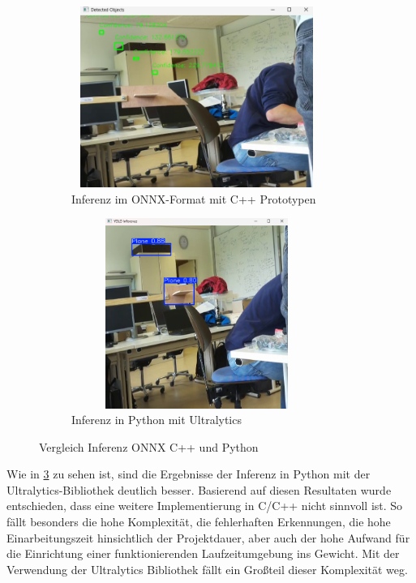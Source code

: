\begin{figure}[h]
\centering
\begin{subfigure}[b]{0.48\textwidth}
  \centering
  \includegraphics[width=0.9\textwidth,height=5.9cm,keepaspectratio]{images/ONNX_Inferenz.png}
  \caption{Inferenz im ONNX-Format mit C++ Prototypen}
  \label{fig:Screenshot: Inferenz im ONNX-Format mit C++ Prototypen}
\end{subfigure}
\hfill
\begin{subfigure}[b]{0.48\textwidth}
  \centering
  \includegraphics[width=0.9\textwidth,height=6.2cm,keepaspectratio]{images/Python_Inferenz.png}
  \caption{Inferenz in Python mit Ultralytics}
  \label{fig:Screenshot: Inferenz Python mit Ultralytics}
\end{subfigure}
\caption{Vergleich Inferenz ONNX C++ und Python}
\label{tab:Vergleich Inferenz ONNX C++ und Python}
\end{figure}

Wie in \ref{tab:Vergleich Inferenz ONNX C++ und Python} zu sehen ist, sind die Ergebnisse der Inferenz in Python mit der Ultralytics-Bibliothek deutlich besser.
Basierend auf diesen Resultaten wurde entschieden, dass eine weitere Implementierung in C/C++ nicht sinnvoll ist. So fällt besonders die hohe Komplexität, die fehlerhaften Erkennungen, die hohe Einarbeitungszeit hinsichtlich der Projektdauer, aber auch der hohe Aufwand für die Einrichtung einer funktionierenden Laufzeitumgebung ins Gewicht. Mit der Verwendung der Ultralytics Bibliothek fällt ein Großteil dieser Komplexität weg. 

